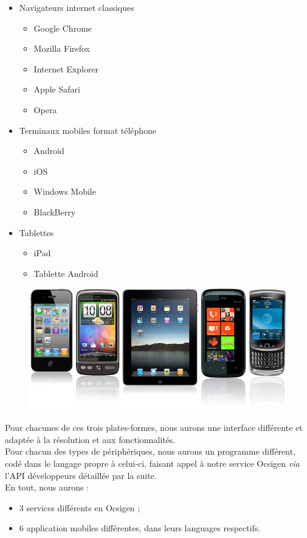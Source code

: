 \documentclass{life-fr}
\begin{document}
\begin{itemize}
  \item Navigateurs internet classiques
    \begin{itemize}
      \item Google Chrome
      \item Mozilla Firefox
      \item Internet Explorer
      \item Apple Safari
      \item Opera
    \end{itemize}
  \item Terminaux mobiles format téléphone
    \begin{itemize}
      \item Android
      \item iOS
      \item Windows Mobile
      \item BlackBerry
    \end{itemize}
  \item Tablettes
    \begin{itemize}
      \item iPad
      \item Tablette Android
    \end{itemize}
\end{itemize}

\begin{figure}[H]
  \begin{center}
    \includegraphics[width=13cm]{img/mobiles.jpg}
  \end{center}
\end{figure}

Pour chacunes de ces trois plates-formes, nous aurons une interface différente
et adaptée à la résolution et aux fonctionnalités.\\
Pour chacun des types de périphériques, nous aurons un programme différent,
codé dans le langage propre à celui-ci, faisant appel à notre service Ocsigen
\textit{via} l'API développeurs détaillée par la suite.\\
En tout, nous aurons :
\begin{itemize}
  \item 3 services différents en Ocsigen ;
  \item 6 application mobiles différentes, dans leurs languages respectifs.
\end{itemize}
\end{document}
